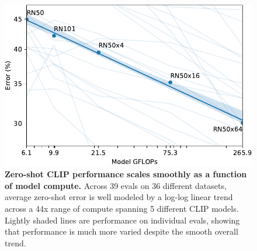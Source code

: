 \documentclass{article}
\begin{document}
\begin{figure}[t]
\begin{center}
\centerline{\includegraphics[width=1.0\columnwidth]{zs-scaling.pdf}}
\caption{\textbf{Zero-shot CLIP performance scales smoothly as a function of model compute.} Across 39 evals on 36 different datasets, average zero-shot error is well modeled by a log-log linear trend across a 44x range of compute spanning 5 different CLIP models. Lightly shaded lines are performance on individual evals, showing that performance is much more varied despite the smooth overall trend.}
\label{zeroshot_scaling}
\end{center}
\vspace{-2em}
\end{figure}
\end{document}
